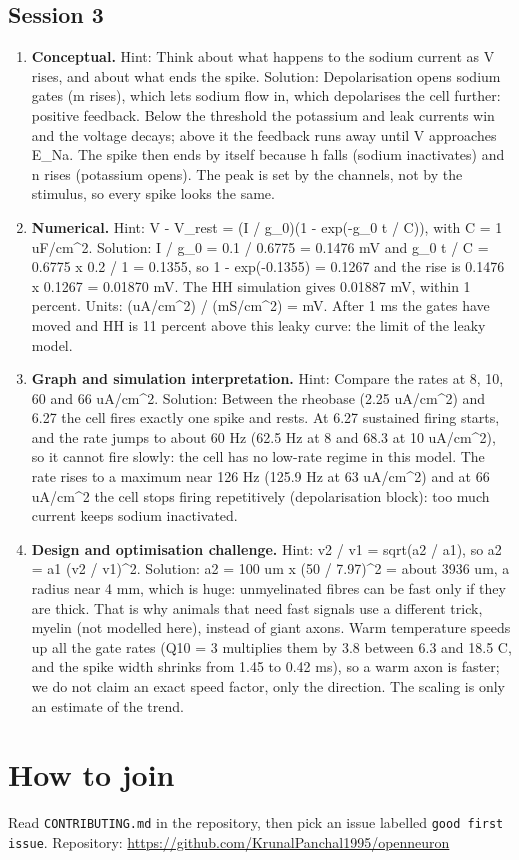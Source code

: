 \documentclass[11pt,a4paper]{article}
\begin{document}
\subsection*{Session 3}
\begin{enumerate}[nosep]
\item \textbf{Conceptual.} Hint: Think about what happens to the sodium current as V rises, and about what ends the spike. Solution: Depolarisation opens sodium gates (m rises), which lets sodium flow in, which depolarises the cell further: positive feedback. Below the threshold the potassium and leak currents win and the voltage decays; above it the feedback runs away until V approaches E\_Na. The spike then ends by itself because h falls (sodium inactivates) and n rises (potassium opens). The peak is set by the channels, not by the stimulus, so every spike looks the same.
\item \textbf{Numerical.} Hint: V - V\_rest = (I / g\_0)(1 - exp(-g\_0 t / C)), with C = 1 uF/cm\textasciicircum{}2. Solution: I / g\_0 = 0.1 / 0.6775 = 0.1476 mV and g\_0 t / C = 0.6775 x 0.2 / 1 = 0.1355, so 1 - exp(-0.1355) = 0.1267 and the rise is 0.1476 x 0.1267 = 0.01870 mV. The HH simulation gives 0.01887 mV, within 1 percent. Units: (uA/cm\textasciicircum{}2) / (mS/cm\textasciicircum{}2) = mV. After 1 ms the gates have moved and HH is 11 percent above this leaky curve: the limit of the leaky model.
\item \textbf{Graph and simulation interpretation.} Hint: Compare the rates at 8, 10, 60 and 66 uA/cm\textasciicircum{}2. Solution: Between the rheobase (2.25 uA/cm\textasciicircum{}2) and 6.27 the cell fires exactly one spike and rests. At 6.27 sustained firing starts, and the rate jumps to about 60 Hz (62.5 Hz at 8 and 68.3 at 10 uA/cm\textasciicircum{}2), so it cannot fire slowly: the cell has no low-rate regime in this model. The rate rises to a maximum near 126 Hz (125.9 Hz at 63 uA/cm\textasciicircum{}2) and at 66 uA/cm\textasciicircum{}2 the cell stops firing repetitively (depolarisation block): too much current keeps sodium inactivated.
\item \textbf{Design and optimisation challenge.} Hint: v2 / v1 = sqrt(a2 / a1), so a2 = a1 (v2 / v1)\textasciicircum{}2. Solution: a2 = 100 um x (50 / 7.97)\textasciicircum{}2 = about 3936 um, a radius near 4 mm, which is huge: unmyelinated fibres can be fast only if they are thick. That is why animals that need fast signals use a different trick, myelin (not modelled here), instead of giant axons. Warm temperature speeds up all the gate rates (Q10 = 3 multiplies them by 3.8 between 6.3 and 18.5 C, and the spike width shrinks from 1.45 to 0.42 ms), so a warm axon is faster; we do not claim an exact speed factor, only the direction. The scaling is only an estimate of the trend.
\end{enumerate}

\section{How to join}
Read \texttt{CONTRIBUTING.md} in the repository, then pick an issue labelled \texttt{good first issue}. Repository: \url{https://github.com/KrunalPanchal1995/openneuron}
\end{document}

